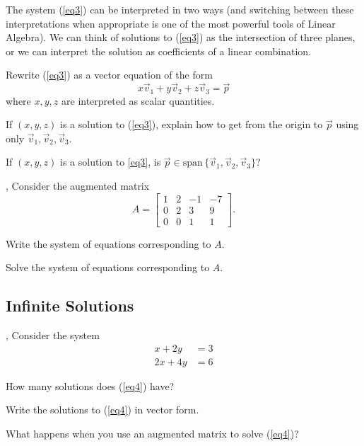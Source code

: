 \documentclass[letter]{article}
\newcommand{\Span}{\mathrm{span}\,}
\begin{document}
	The system (\ref{eq3}) can be interpreted in two ways (and switching between these 
	interpretations when appropriate is one of the most powerful tools of Linear 
	Algebra).  We can think of solutions to (\ref{eq3})
	as the intersection of three planes, or we can interpret the solution
	as coefficients of a linear combination.

	\begin{Enum}[resume]
		\item Rewrite (\ref{eq3}) as a vector equation of the form
		\[
			x\vec v_1+y\vec v_2+z\vec v_3 = \vec p
		\]
		where $x,y,z$ are interpreted as scalar quantities.

		\item If $(x,y,z)$ is a solution to (\ref{eq3}), explain how to get from the
		origin to $\vec p$ using only $\vec v_1, \vec v_2, \vec v_3$.
		\item If $(x,y,z)$ is a solution to \eqref{eq3}, is $\vec p\in\Span\{\vec v_1,\vec v_2,\vec v_3\}$?
	\end{Enum}

	\sep
	Consider the augmented matrix
	\[
		A=\left[\begin{array}{ccc|c}
			1 & 2 & -1 & -7\\
			0 & 2 & 3 & 9\\
			0 & 0 & 1 & 1
		\end{array}\right].
	\]
	\begin{Enum}
		\item Write the system of equations corresponding to $A$.
		\item Solve the system of equations corresponding to $A$.
	\end{Enum}

\subsection*{Infinite Solutions}
	\sep
	Consider the system
	\begin{equation}\label{eq4}
		\begin{array}{ll}
			x+2y &= 3\\
			2x+4y &= 6
		\end{array}
	\end{equation}

	\begin{Enum}
		\item How many solutions does (\ref{eq4}) have?
		\item Write the solutions to (\ref{eq4}) in vector form.
		\item What happens when you use an augmented matrix
		to solve (\ref{eq4})?
	\end{Enum}
\end{document}
